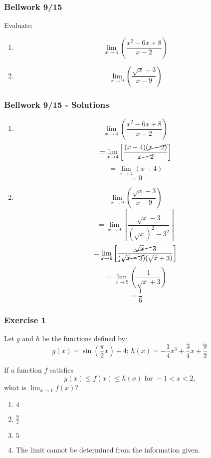 \documentclass[12pt]{beamer}
\begin{document}
\begin{frame}
	\frametitle{Bellwork 9/15}
	\vspace*{\fill}
	\vspace*{\fill}
	\Large
	Evaluate:\\
	\large
	\initclock
	\begin{enumerate}
		\item \[\displaystyle\lim_{x\to4}\left(\frac{x^2-6x+8}{x-2}\right)\]
		\item \[\displaystyle\lim_{x\to9}\left(\frac{\sqrt{x}-3}{x-9}\right)\]
	\end{enumerate}
	\vspace*{\fill}
	\vspace*{\fill}
	\vspace*{\fill}
	\crono
\end{frame}
\begin{frame}
	\frametitle{Bellwork 9/15 - Solutions}
	\begin{multicols}{2}
		\begin{enumerate}\itemsep6ex
			\large
			\item{
			            \[\displaystyle\lim_{x\to4}\left(\frac{x^2-6x+8}{x-2}\right)\]
			            \[=\displaystyle\lim_{x\to4}\left[\frac{(x-4)\cancel{(x-2)}}{\cancel{x-2}}\right]\]
			            \[=\displaystyle\lim_{x\to4}(x-4)\]
			            \[=\boxed{0}\]
			      }
			\small
			\item{
			            \[\displaystyle\lim_{x\to9}\left(\frac{\sqrt{x}-3}{x-9}\right)\]
			            \[=\displaystyle\lim_{x\to9}\left[\frac{\sqrt{x}-3}{(\sqrt{x})^2-3^2}\right]\]
			            \[=\displaystyle\lim_{x\to9}\left[\frac{\cancel{\sqrt{x}-3}}{\cancel{(\sqrt{x}-3)}(\sqrt{x}+3)}\right]\] %
			            \[=\displaystyle\lim_{x\to9}\left(\frac{1}{\sqrt{x}+3}\right)\]
			            \[=\boxed{\frac{1}{6}}\]
			      }
		\end{enumerate}
	\end{multicols}
\end{frame}
\begin{frame}
	\frametitle{Exercise 1}
	Let $g$ and $h$ be the functions defined by: \[g(x) = \sin\left(\frac{\pi}{2}x\right)+4 \text{; } h(x) = -\frac{1}{4}x^3+\frac{3}{4}x+\frac{9}{2}\]\par
	If a function $f$ satisfies \[g(x)\leq f(x)\leq h(x) \text{ for } -1 < x < 2\text{,}\] what is $\displaystyle\lim_{x\to1}f(x)$?\par
	\vspace*{\fill}
	\begin{enumerate}\itemsep1ex
		\item $4$
		\item $\frac{9}{2}$
		\item $5$
		\item The limit cannot be determined from the information given.
	\end{enumerate}
\end{frame}
\end{document}
